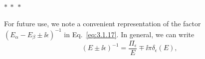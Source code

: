 \begin{center}
$*\ *\ *$
\end{center}

For future use, we note a convenient representation of the factor
$(E_\alpha-E_\beta\mathbin{\pm}\ii\epsilon)^{-1}$ in Eq.~\eqref{eq:3.1.17}. In
general, we can write
\begin{equation}
(E\mathbin{\pm}\ii\epsilon)^{-1}
=\frac{\Pi_\epsilon}{E}\mp \ii\pi\delta_\epsilon(E),
\tag{3.1.22}\label{eq:3.1.22}
\end{equation}
